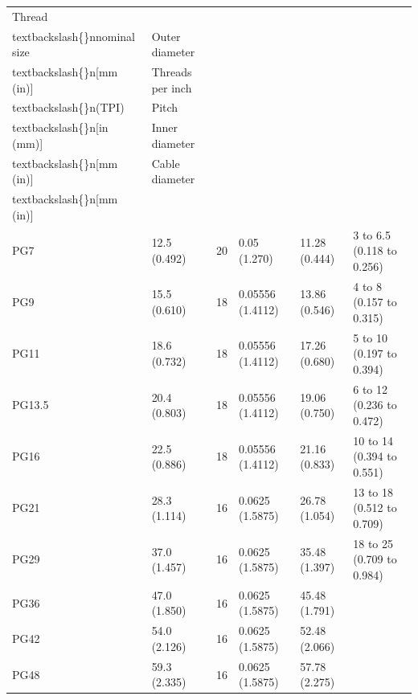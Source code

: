 \documentclass{article}
\begin{document}
\begin{tabular}{llllll}
\toprule
Thread\\textbackslash\{\}nnominal size & Outer diameter\\textbackslash\{\}n[mm (in)] & Threads per inch\\textbackslash\{\}n(TPI) & Pitch\\textbackslash\{\}n[in (mm)] & Inner diameter\\textbackslash\{\}n[mm (in)] & Cable diameter\\textbackslash\{\}n[mm (in)] \\
\midrule
PG7 & 12.5 (0.492) & 20 & 0.05 (1.270) & 11.28 (0.444) & 3 to 6.5 (0.118 to 0.256) \\
PG9 & 15.5 (0.610) & 18 & 0.05556 (1.4112) & 13.86 (0.546) & 4 to 8 (0.157 to 0.315) \\
PG11 & 18.6 (0.732) & 18 & 0.05556 (1.4112) & 17.26 (0.680) & 5 to 10 (0.197 to 0.394) \\
PG13.5 & 20.4 (0.803) & 18 & 0.05556 (1.4112) & 19.06 (0.750) & 6 to 12 (0.236 to 0.472) \\
PG16 & 22.5 (0.886) & 18 & 0.05556 (1.4112) & 21.16 (0.833) & 10 to 14 (0.394 to 0.551) \\
PG21 & 28.3 (1.114) & 16 & 0.0625 (1.5875) & 26.78 (1.054) & 13 to 18 (0.512 to 0.709) \\
PG29 & 37.0 (1.457) & 16 & 0.0625 (1.5875) & 35.48 (1.397) & 18 to 25 (0.709 to 0.984) \\
PG36 & 47.0 (1.850) & 16 & 0.0625 (1.5875) & 45.48 (1.791) &  \\
PG42 & 54.0 (2.126) & 16 & 0.0625 (1.5875) & 52.48 (2.066) &  \\
PG48 & 59.3 (2.335) & 16 & 0.0625 (1.5875) & 57.78 (2.275) &  \\
\bottomrule
\end{tabular}
\end{document}
